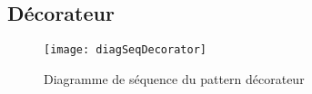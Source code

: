 \subsection{Décorateur}
\begin{figure}[h]
\begin{center}
    \texttt{[image: diagSeqDecorator]}
\end{center}
    \caption{Diagramme de séquence du pattern décorateur}
    \label{sequence-decorateur}
\end{figure}